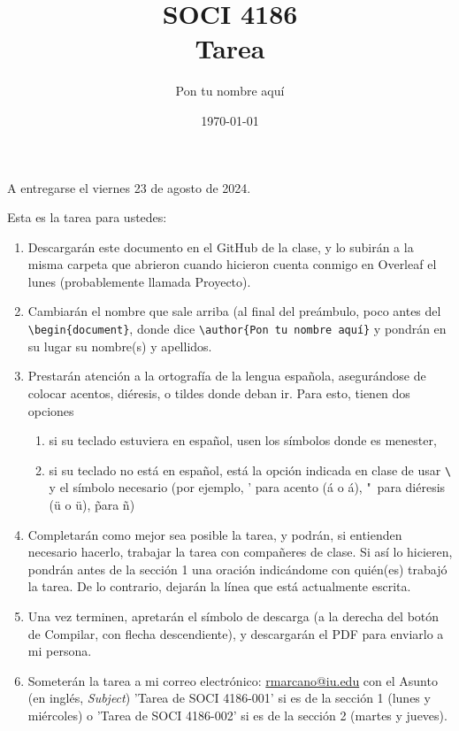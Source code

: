 \documentclass[11pt]{article} %
\title{SOCI 4186\\ Tarea \textnumero 1}
\author{Pon tu nombre aquí}
\date{\today}
\begin{document}
\maketitle
\begin{center}
   A entregarse el viernes 23 de agosto de 2024. 
\end{center}

Esta es la tarea para ustedes: 
\begin{enumerate}
    \item Descargarán este documento en el GitHub de la clase, y lo subirán a la misma carpeta que abrieron cuando hicieron cuenta conmigo en Overleaf el lunes (probablemente llamada Proyecto).
    \item Cambiarán el nombre que sale arriba (al final del preámbulo, poco antes del \texttt{\textbackslash begin\{document\}}, donde dice \texttt{\textbackslash author\{Pon tu nombre aquí\}} y pondrán en su lugar su nombre(s) y apellidos.
    \item Prestarán atención a la ortografía de la lengua española, asegurándose de colocar acentos, diéresis, o tildes donde deban ir. Para esto, tienen dos opciones 
    \begin{enumerate}
        \item si su teclado estuviera en español, usen los símbolos donde es menester,
        \item si su teclado no está en español, está la opción indicada en clase de usar \texttt{\textbackslash} y el símbolo necesario (por ejemplo, ' para acento (\'a o \'{a}), "\ para diéresis (\"u o \"{u}), \~ para \~n)
    \end{enumerate}
    \item Completarán como mejor sea posible la tarea, y podrán, si entienden necesario hacerlo, trabajar la tarea con compañeres de clase. Si así lo hicieren, pondrán antes de la sección 1 una oración indicándome con quién(es) trabajó la tarea. De lo contrario, dejarán la línea que está actualmente escrita.
    \item  Una vez terminen, apretarán el símbolo de descarga (a la derecha del botón de Compilar, con flecha descendiente), y descargarán el PDF para enviarlo a mi persona.
    \item Someterán la tarea a mi correo electrónico: \href{mailto:rmarcano@iu.edu}{rmarcano@iu.edu} con el Asunto (en inglés, \textit{Subject}) 'Tarea de SOCI 4186-001' si es de la sección 1 (lunes y miércoles) o 'Tarea de SOCI 4186-002' si es de la sección 2 (martes y jueves).
\end{enumerate}
\end{document}
